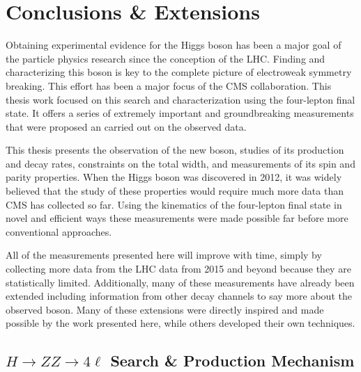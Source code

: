 \chapter{Conclusions \& Extensions}
\label{sec:Conclusions}

Obtaining experimental evidence for the Higgs boson has been a major goal of the particle physics research since the conception of the LHC. Finding and characterizing this boson is key to the complete picture of electroweak symmetry breaking. This effort has been a major focus of the CMS collaboration. This thesis work focused on this search and characterization using the four-lepton final state. It offers a series of extremely important and groundbreaking measurements that were proposed an carried out on the observed data.

This thesis presents the observation of the new boson, studies of its production and decay rates, constraints on the total width, and measurements of its spin and parity properties. When the Higgs boson was discovered in 2012, it was widely believed that the study of these properties would require much more data than CMS has collected so far. Using the kinematics of the four-lepton final state in novel and efficient ways these measurements were made possible far before more conventional approaches.

All of the measurements presented here will improve with time, simply by collecting more data from the LHC data from 2015 and beyond because they are statistically limited. Additionally, many of these measurements have already been extended including information from other decay channels to say more about the observed boson. Many of these extensions were directly inspired and made possible by the work presented here, while others developed their own techniques.

\section{$H \to ZZ \to 4\ell$ Search \& Production Mechanism}
\label{sec:Summary_ProducitonDecay}

